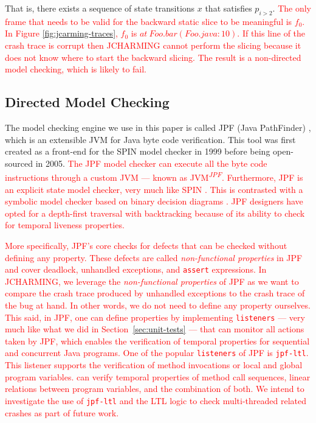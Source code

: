 \documentclass[times, doublespace]{smrauth}
\newcommand{\red}[1]{\textcolor{red}{#1}}
\begin{document}
{That is, there exists a sequence of state transitions $x$ that
satisfies $p_{i>2}$. \red{The only frame that
needs to be valid for the backward static slice to be
meaningful is $f_0$. In Figure \ref{fig:jcarming-traces}, $f_0$ is $at~ Foo.bar(Foo.java:10)$.
If this line of the crash trace is corrupt then JCHARMING cannot perform the slicing because it does not know where to start the backward slicing.
The result is a non-directed model checking, which is likely to fail.}

\subsection{Directed Model Checking}

The model checking engine we use in this paper is called JPF
(Java PathFinder) \cite{Visser2004}, which is an extensible JVM for Java
byte code verification. This tool was first created as a front-end
for the SPIN model checker \cite{holzmann1997model} in 1999 before being
open-sourced in 2005.
\red{The JPF model checker can execute all the byte code instructions through a custom JVM --- known as JVM\textsuperscript{\textit{JPF}}. Furthermore, JPF is an explicit state model checker,
very much like SPIN \cite{holzmann1997model}. This is contrasted with a symbolic model
checker based on binary decision diagrams \cite{mcmillan1993symbolic}.
JPF designers have opted for a depth-first traversal with backtracking  because of its ability to check for temporal liveness properties.}

\red{More specifically, JPF's core checks for defects that can be checked without defining any property.
These defects are called \textit{non-functional properties} in JPF and cover deadlock, unhandled exceptions, and \texttt{assert} expressions.
In JCHARMING, we leverage the \textit{non-functional properties} of JPF as we want to compare the crash trace produced by unhandled exceptions to the crash trace of the bug at hand. In other words, we do not need to define any property ourselves.
This said, in JPF, one can define properties by implementing \texttt{listeners} --- very much like what we did in Section~\ref{sec:unit-tests} --- that can monitor all actions taken by JPF, which enables the verification of temporal properties for sequential and concurrent Java programs.
One of the popular \texttt{listeners} of JPF is \texttt{jpf-ltl}.
This listener supports the verification of method invocations or local and global program variables. \textttt{jpf-ltl} can verify temporal properties of method call sequences, linear relations between program variables, and the combination of both.
We intend to investigate the use of \texttt{jpf-ltl} and the LTL logic to check multi-threaded related crashes as part of future work.}

}
\end{document}
